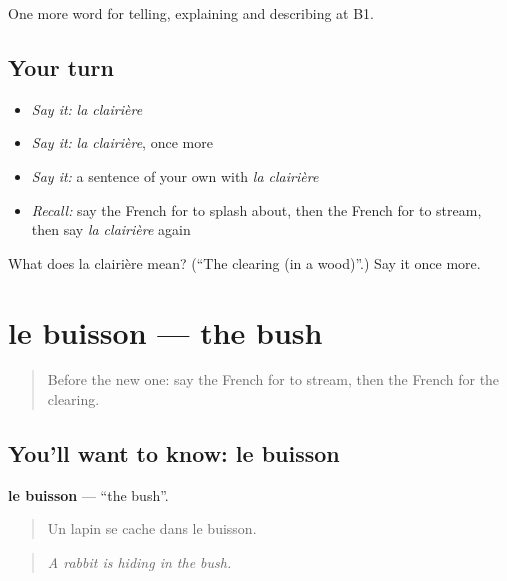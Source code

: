 \begin{grammarlens}[title={What you've built}]
One more word for telling, explaining and describing at B1.
\end{grammarlens}

\subsection*{Your turn}
\begin{itemize}
\raggedright
  \item \emph{Say it:} \emph{la clairière}
  \item \emph{Say it:} \emph{la clairière}, once more
  \item \emph{Say it:} a sentence of your own with \emph{la clairière}
  \item \emph{Recall:} say the French for to splash about, then the French for to stream, then say \emph{la clairière} again
\end{itemize}

\begin{tcolorbox}[breakable,colback=teal!4,colframe=teal!35!black,title={Before you move on}]
What does la clairière mean? (\textquotedblleft{}The clearing (in a wood)\textquotedblright{}.) Say it once more.
\end{tcolorbox}
\section[le buisson]{le buisson — the bush}

\label{lesson:FR-C457-buisson}



\begin{quote}
Before the new one: say the French for to stream, then the French for the clearing.
\end{quote}

\subsection*{You'll want to know: le buisson}
\textbf{le buisson} — \textquotedblleft{}the bush\textquotedblright{}.

\begin{quote}
Un lapin se cache dans le buisson.
\end{quote}

\begin{quote}
\emph{A rabbit is hiding in the bush.}
\end{quote}

